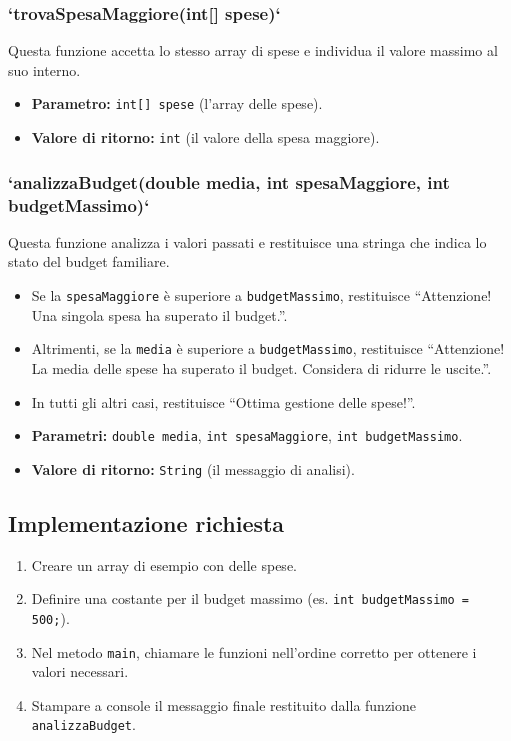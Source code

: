 \documentclass{article}
\begin{document}
    \subsubsection*{`trovaSpesaMaggiore(int[] spese)`}
    Questa funzione accetta lo stesso array di spese e individua il valore massimo al suo interno.
    \begin{itemize}
        \item \textbf{Parametro:} \texttt{int[] spese} (l'array delle spese).
        \item \textbf{Valore di ritorno:} \texttt{int} (il valore della spesa maggiore).
    \end{itemize}

    \subsubsection*{`analizzaBudget(double media, int spesaMaggiore, int budgetMassimo)`}
    Questa funzione analizza i valori passati e restituisce una stringa che indica lo stato del budget familiare.
    \begin{itemize}
        \item Se la \texttt{spesaMaggiore} è superiore a \texttt{budgetMassimo}, restituisce ``Attenzione! Una singola spesa ha superato il budget.''.
        \item Altrimenti, se la \texttt{media} è superiore a \texttt{budgetMassimo}, restituisce ``Attenzione! La media delle spese ha superato il budget. Considera di ridurre le uscite.''.
        \item In tutti gli altri casi, restituisce ``Ottima gestione delle spese!''.
    \end{itemize}
    \begin{itemize}
        \item \textbf{Parametri:} \texttt{double media}, \texttt{int spesaMaggiore}, \texttt{int budgetMassimo}.
        \item \textbf{Valore di ritorno:} \texttt{String} (il messaggio di analisi).
    \end{itemize}

    \subsection*{Implementazione richiesta}
    \begin{enumerate}
        \item Creare un array di esempio con delle spese.
        \item Definire una costante per il budget massimo (es. \texttt{int budgetMassimo = 500;}).
        \item Nel metodo \texttt{main}, chiamare le funzioni nell'ordine corretto per ottenere i valori necessari.
        \item Stampare a console il messaggio finale restituito dalla funzione \texttt{analizzaBudget}.
    \end{enumerate}
\end{document}

